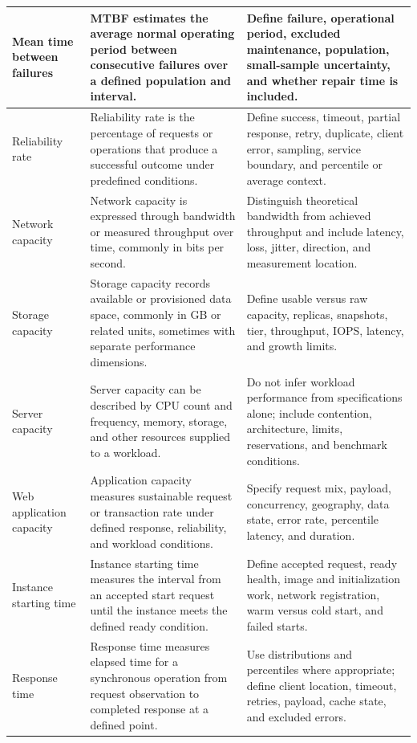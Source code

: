 \documentclass[11pt]{article}
\begin{document}
\begin{longtable}{@{}>{\RaggedRight\arraybackslash}p{}>{\RaggedRight\arraybackslash}p{}>{\RaggedRight\arraybackslash}p{}@{}}
Mean time between failures & MTBF estimates the average normal operating period between consecutive failures over a defined population and interval. & Define failure, operational period, excluded maintenance, population, small-sample uncertainty, and whether repair time is included. \\\midrule
Reliability rate & Reliability rate is the percentage of requests or operations that produce a successful outcome under predefined conditions. & Define success, timeout, partial response, retry, duplicate, client error, sampling, service boundary, and percentile or average context. \\\midrule
Network capacity & Network capacity is expressed through bandwidth or measured throughput over time, commonly in bits per second. & Distinguish theoretical bandwidth from achieved throughput and include latency, loss, jitter, direction, and measurement location. \\\midrule
Storage capacity & Storage capacity records available or provisioned data space, commonly in GB or related units, sometimes with separate performance dimensions. & Define usable versus raw capacity, replicas, snapshots, tier, throughput, IOPS, latency, and growth limits. \\\midrule
Server capacity & Server capacity can be described by CPU count and frequency, memory, storage, and other resources supplied to a workload. & Do not infer workload performance from specifications alone; include contention, architecture, limits, reservations, and benchmark conditions. \\\midrule
Web application capacity & Application capacity measures sustainable request or transaction rate under defined response, reliability, and workload conditions. & Specify request mix, payload, concurrency, geography, data state, error rate, percentile latency, and duration. \\\midrule
Instance starting time & Instance starting time measures the interval from an accepted start request until the instance meets the defined ready condition. & Define accepted request, ready health, image and initialization work, network registration, warm versus cold start, and failed starts. \\\midrule
Response time & Response time measures elapsed time for a synchronous operation from request observation to completed response at a defined point. & Use distributions and percentiles where appropriate; define client location, timeout, retries, payload, cache state, and excluded errors. \\\midrule

\end{longtable}
\end{document}
